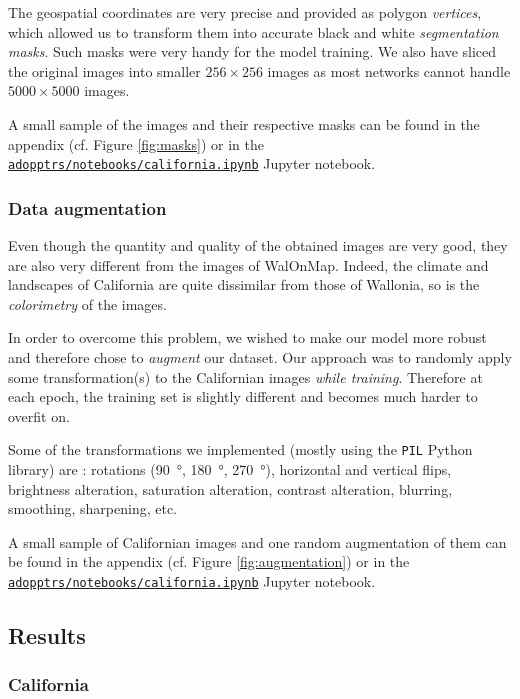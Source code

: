 \documentclass[a4paper, 12pt]{article}
\begin{document}
The geospatial coordinates are very precise and provided as polygon \emph{vertices}, which allowed us to transform them into accurate black and white \emph{segmentation masks}. Such masks were very handy for the model training. We also have sliced the original images into smaller $256 \times 256$ images as most networks cannot handle $5000 \times 5000$ images.

A small sample of the images and their respective masks can be found in the appendix (cf. Figure \ref{fig:masks}) or in the \href{https://github.com/francois-rozet/adopptrs/blob/master/notebooks/california.ipynb}{\texttt{adopptrs/notebooks/california.ipynb}} Jupyter notebook.

\subsubsection{Data augmentation}

Even though the quantity and quality of the obtained images are very good, they are also very different from the images of WalOnMap. Indeed, the climate and landscapes of California are quite dissimilar from those of Wallonia, so is the \emph{colorimetry} of the images.

In order to overcome this problem, we wished to make our model more robust and therefore chose to \emph{augment} our dataset. Our approach was to randomly apply some transformation(s) to the Californian images \emph{while training}. Therefore at each epoch, the training set is slightly different and becomes much harder to overfit on.

Some of the transformations we implemented (mostly using the \texttt{PIL} Python library) are : rotations (\SI{90}{\degree}, \SI{180}{\degree}, \SI{270}{\degree}), horizontal and vertical flips, brightness alteration, saturation alteration, contrast alteration, blurring, smoothing, sharpening, etc.

A small sample of Californian images and one random augmentation of them can be found in the appendix (cf. Figure \ref{fig:augmentation}) or in the \href{https://github.com/francois-rozet/adopptrs/blob/master/notebooks/california.ipynb}{\texttt{adopptrs/notebooks/california.ipynb}} Jupyter notebook.

\subsection{Results} \label{sec:enum_results}

\subsubsection{California}
\end{document}
